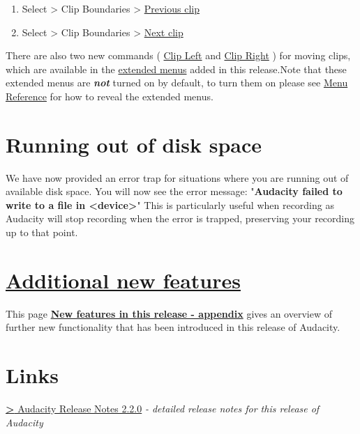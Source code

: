 \begin{multicols}{2}
\begin{enumerate}
\item Select > Clip Boundaries > 
\hyperref[XXX\foo{select_menu_clip_boundaries__previous_clip}]{Previous clip}

\item Select > Clip Boundaries > 
\hyperref[XXX\foo{select_menu_clip_boundaries__next_clip}]{Next clip}

\end{enumerate}
There are also two new commands (
\hyperref[XXX\foo{ext_command_menu_cursor__clip_left}]{Clip Left}
 and 
\hyperref[XXX\foo{ext_command_menu_cursor__clip_right}]{Clip Right}
) for moving clips, which are available in the 
\hyperref[XXX\foo{_extendedmenubar}]{extended menus}
 added in this release.Note that these extended menus are \textit{\textbf{not}} turned on by default, to turn them on please see 
\hyperref[XXX\foo{menu_reference__the_extended_menu_bar}]{Menu Reference}
 for how to reveal the extended menus.
\section{Running out of disk space}We have now provided an error trap for situations where you are running out of available disk space.
You will now see the error message:
"\textbf{Audacity failed to write to a file in <device>}"
This is particularly useful when recording as Audacity will stop recording when the error is trapped, preserving your recording up to that point.

\section{
\hyperref[XXX\foo{new_features_in_this_release_appendix_}]{Additional new features}
}This page \textbf{
\hyperref[XXX\foo{new_features_in_this_release_appendix_}]{New features in this release - appendix}
} gives an overview of further new functionality that has been introduced in this release of Audacity.

\section{Links}
\hyperref[XXX\foo{https:__wiki.audacityteam.org_wiki_Release_Notes_2.2.0}]{\textbf{>} Audacity Release Notes 2.2.0}
\textit{- detailed release notes for this release of Audacity}\end{multicols}